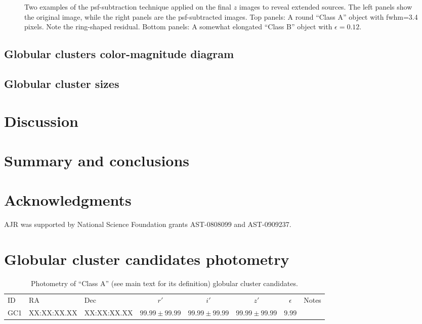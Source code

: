 \documentclass[useAMS,usenatbib]{mn2e}
\begin{document}
\begin{figure}
\caption{Two examples of the psf-subtraction technique applied on the
  final $z$ images to reveal extended sources. The left panels show
  the original image, while the right panels are the psf-subtracted
  images. Top panels: A round ``Class A'' object with fwhm=3.4
  pixels. Note the ring-shaped residual. Bottom panels: A somewhat
  elongated ``Class B'' object with $\epsilon=0.12$.}
\label{fig:subtraction}
\end{figure}

\subsection{Globular clusters color-magnitude diagram}
\label{sec:gc_cmd}

\subsection{Globular cluster sizes}
\label{sec:gc_sizes}


\section{Discussion}
\label{sec:discussion}

\section{Summary and conclusions}
\label{sec:conclusions}


\section*{Acknowledgments}

AJR was supported by National Science Foundation grants AST-0808099
and AST-0909237.




\appendix
\section{Globular cluster candidates photometry}
\label{sec:appendix}
\begin{table*}
 \centering
 \caption{Photometry of ``Class A'' (see main text for its definition) globular cluster candidates.}
\label{tab:class_a}  
\begin{tabular}{@{}lllccccl@{}}
  \hline
ID & RA & Dec &$r'$& $i'$& $z'$& $\epsilon$& Notes\\
GC1 & XX:XX:XX.XX & XX:XX:XX.XX & $99.99 \pm 99.99$ & $99.99 \pm 99.99$ & $99.99 \pm 99.99$ & $ 9.99$& \\
 \hline

\hline
\end{tabular}
\end{table*}
\end{document}
